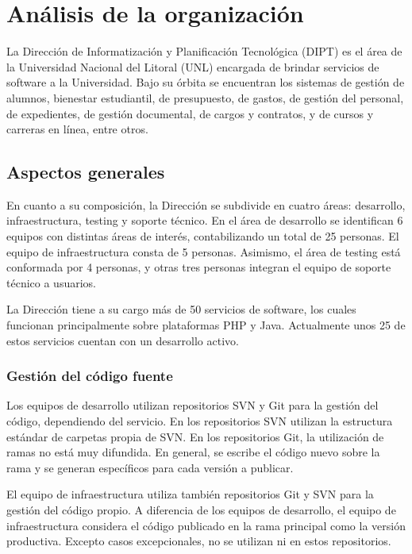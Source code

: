 \chapter{Análisis de la organización}

La Dirección de Informatización y Planificación Tecnológica (DIPT) es
el área de la Universidad Nacional del Litoral (UNL) encargada de
brindar servicios de software a la Universidad. Bajo su órbita se
encuentran los sistemas de gestión de alumnos, bienestar estudiantil,
de presupuesto, de gastos, de gestión del personal, de expedientes, de
gestión documental, de cargos y contratos, y de cursos y carreras en
línea, entre otros.

\section{Aspectos generales}

En cuanto a su composición, la Dirección se subdivide en cuatro áreas:
desarrollo, infraestructura, testing y soporte técnico. En el área de
desarrollo se identifican 6 equipos con distintas áreas de interés,
contabilizando un total de 25 personas. El equipo de infraestructura
consta de 5 personas. Asimismo, el área de testing está conformada por
4 personas, y otras tres personas integran el equipo de soporte
técnico a usuarios.

La Dirección tiene a su cargo más de 50 servicios de software, los
cuales funcionan principalmente sobre plataformas PHP y
Java. Actualmente unos 25 de estos servicios cuentan con un desarrollo
activo.

\subsection{Gestión del código fuente}

Los equipos de desarrollo utilizan repositorios SVN y Git para la
gestión del código, dependiendo del servicio. En los repositorios SVN
utilizan la estructura estándar de carpetas
 propia de SVN. En los repositorios Git,
la utilización de ramas no está muy difundida. En general, se escribe
el código nuevo sobre la rama  y se generan
 específicos para cada versión a publicar.

El equipo de infraestructura utiliza también repositorios Git y SVN
para la gestión del código propio. A diferencia de los equipos de
desarrollo, el equipo de infraestructura considera el código publicado
en la rama principal como la versión productiva. Excepto casos
excepcionales, no se utilizan  ni  en
estos repositorios.

